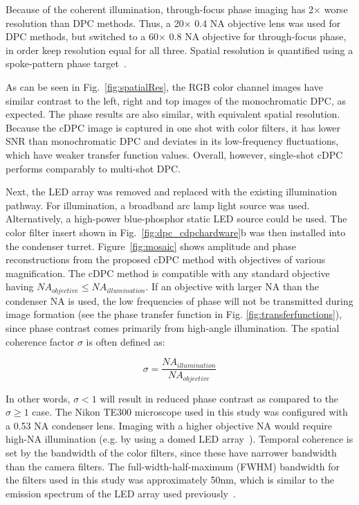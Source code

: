 Because of the coherent illumination, through-focus phase imaging has 2$\times$ worse resolution than DPC methods. Thus, a 20$\times$ 0.4 NA objective lens was used for DPC methods, but switched to a 60$\times$ 0.8 NA objective for through-focus phase, in order keep resolution equal for all three. Spatial resolution is quantified using a spoke-pattern phase target~\cite{standardphaseresolution2016}.

As can be seen in Fig.~\ref{fig:spatialRes}, the RGB color channel images have similar contrast to the left, right and top images of the monochromatic DPC, as expected. The phase results are also similar, with equivalent spatial resolution. Because the cDPC image is captured in one shot with color filters, it has lower SNR than monochromatic DPC and deviates in its low-frequency fluctuations, which have weaker transfer function values. Overall, however, single-shot cDPC performs comparably to multi-shot DPC.

Next, the LED array was removed and replaced with the existing illumination pathway. For illumination, a broadband arc lamp light source was used. Alternatively, a high-power blue-phosphor static LED source could be used. The color filter insert shown in Fig.~\ref{fig:dpc_cdpchardware}b was then installed into the condenser turret. Figure~\ref{fig:mosaic} shows amplitude and phase reconstructions from the proposed cDPC method with objectives of various magnification. The cDPC method is compatible with any standard objective having $ NA_{objective}\leq NA_{illumination}$. If an objective with larger NA than the condenser NA is used, the low frequencies of phase will not be transmitted during image formation (see the phase transfer function in Fig. \ref{fig:transferfunctions}), since phase contrast comes primarily from high-angle illumination. The spatial coherence factor $\sigma$ is often defined as:

\begin{equation}
\sigma = \frac{NA_{illumination}}{NA_{objective}}
\end{equation}

\noindent In other words, $\sigma < 1$ will result in reduced phase contrast as compared to the $\sigma \geq 1$ case. The Nikon TE300 microscope used in this study was configured with a 0.53 NA condenser lens. Imaging with a higher objective NA would require high-NA illumination (e.g. by using a domed LED array~\cite{phillips2015multi}). Temporal coherence is set by the bandwidth of the color filters, since these have narrower bandwidth than the camera filters. The full-width-half-maximum (FWHM) bandwidth for the filters used in this study was approximately 50nm, which is similar to the emission spectrum of the LED array used previously~\cite{tian2015quantitative}.

